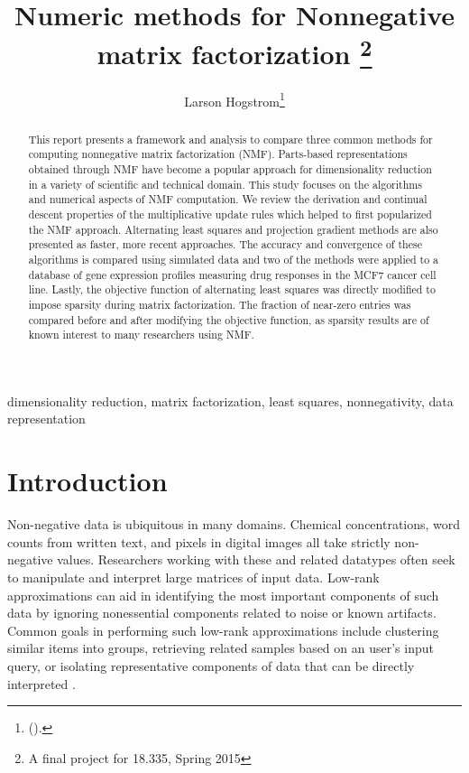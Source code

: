 \documentclass[final,leqno,onefignum,onetabnum]{siamltex1213}
\title{Numeric methods for Nonnegative matrix factorization \thanks{A final project for 18.335, Spring 2015}}
\author{Larson Hogstrom\thanks{
(\email{hogstrom@mit.edu}). }}
\begin{document}
\maketitle
{}%

\begin{abstract} This report presents a framework and analysis to compare three common methods for computing nonnegative matrix factorization (NMF). Parts-based representations obtained through NMF have become a popular approach for dimensionality reduction in a variety of scientific and technical domain. This study focuses on the algorithms and numerical aspects of NMF computation. We review the derivation and continual descent properties of the multiplicative update rules which helped to first popularized the NMF approach. Alternating least squares and projection gradient methods are also presented as faster, more recent approaches. The accuracy and convergence of these algorithms is compared using simulated data and two of the methods were applied to a database of gene expression profiles measuring drug responses in the MCF7 cancer cell line. Lastly, the objective function of alternating least squares was directly modified to impose sparsity during matrix factorization. The fraction of near-zero entries was compared before and after modifying the objective function, as sparsity results are of known interest to many researchers using NMF. 
\end{abstract}

\begin{keywords} dimensionality reduction, matrix factorization, least squares, nonnegativity, data representation \end{keywords}



\pagestyle{myheadings}
\thispagestyle{plain}

\section{Introduction}

Non-negative data is ubiquitous in many domains. Chemical concentrations, word counts from written text, and pixels in digital images all take strictly non-negative values. Researchers working with these and related datatypes often seek to manipulate and interpret large matrices of input data. Low-rank approximations can aid in identifying the most important components of such data by ignoring nonessential components related to noise or known artifacts. Common goals in performing such low-rank approximations include clustering similar items into groups, retrieving related samples based on an user's input query, or isolating representative components of data that can be directly interpreted \cite{Lan}.  
\end{document}
